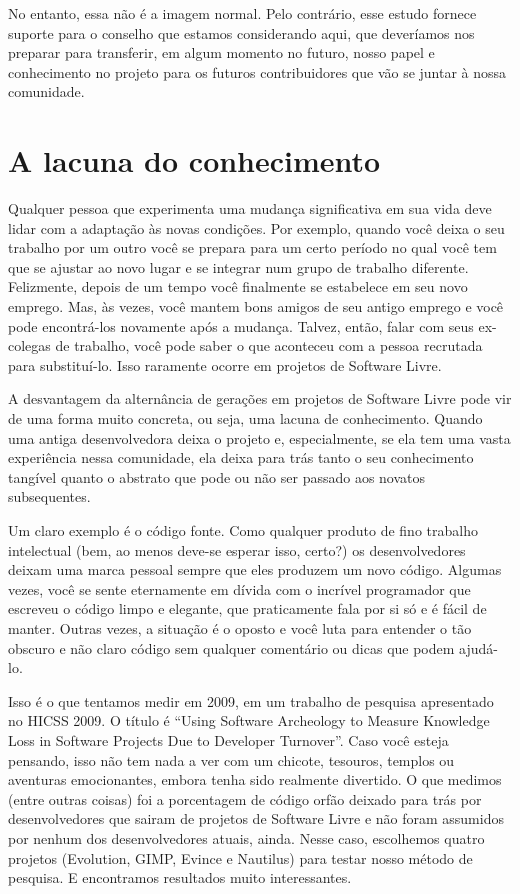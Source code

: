 No entanto, essa não é a imagem normal. Pelo contrário, esse estudo fornece
suporte para o conselho que estamos considerando aqui, que deveríamos nos
preparar para transferir, em algum momento no futuro, nosso papel e conhecimento no
projeto para os futuros contribuidores que vão se juntar à nossa comunidade.

\section*{A lacuna do conhecimento}

Qualquer pessoa que experimenta uma mudança significativa em sua vida deve lidar
com a adaptação às novas condições. Por exemplo, quando você deixa o seu trabalho
por um outro você se prepara para um certo período no qual você tem que se ajustar
ao novo lugar e se integrar num grupo de trabalho diferente. Felizmente, depois de
um tempo você finalmente se estabelece em seu novo emprego. Mas, às vezes, você
mantem bons amigos de seu antigo emprego e você pode encontrá-los novamente após
a mudança. Talvez, então, falar com seus ex-colegas de trabalho, você pode saber
o que aconteceu com a pessoa recrutada para substituí-lo. Isso raramente ocorre em
projetos de Software Livre.

A desvantagem da alternância de gerações em projetos de Software Livre pode
vir de uma forma muito concreta, ou seja, uma lacuna de conhecimento. Quando uma
antiga desenvolvedora deixa o projeto e, especialmente, se ela tem uma vasta experiência
nessa comunidade, ela deixa para trás tanto o seu conhecimento tangível quanto o abstrato
que pode ou não ser passado aos novatos subsequentes.

Um claro exemplo é o código fonte. Como qualquer produto de fino trabalho intelectual
(bem, ao menos deve-se esperar isso, certo?) os desenvolvedores deixam uma marca
pessoal sempre que eles produzem um novo código. Algumas vezes, você se sente eternamente
em dívida com o incrível programador que escreveu o código limpo e elegante, que praticamente
fala por si só e é fácil de manter. Outras vezes, a situação é o oposto e você luta
para entender o tão obscuro e não claro código sem qualquer comentário ou dicas
que podem ajudá-lo.

Isso é o que tentamos medir em 2009, em um trabalho de pesquisa apresentado no HICSS
2009. O título é ``Using Software Archeology to Measure Knowledge Loss in
Software Projects Due to Developer Turnover''. Caso você esteja pensando, isso não
tem nada a ver com um chicote, tesouros, templos ou aventuras emocionantes, embora
tenha sido realmente divertido. O que medimos (entre outras coisas) foi a porcentagem
de código orfão deixado para trás por desenvolvedores que sairam de projetos de Software
Livre e não foram assumidos por nenhum dos desenvolvedores atuais, ainda. Nesse caso,
escolhemos quatro projetos (Evolution, GIMP, Evince e Nautilus) para testar nosso método
de pesquisa. E encontramos resultados muito interessantes.

